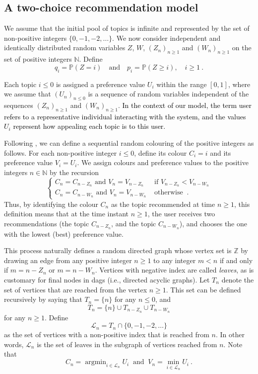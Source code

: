 \documentclass[12pt]{article}
\newcommand{\N}{\mathbb{N}}
\newcommand{\Z}{\mathbb{Z}}
\numberwithin{equation}{section} \font\titre=cmbx12
\newcommand{\argmin}{\mathop{\mathrm{argmin}}}
\newcommand{\PP}{\mathbb{P}}
\newcommand{\Lset}{\mathcal{L}} %
\begin{document}
\subsection{A two-choice recommendation model}

We assume that the initial pool of topics is infinite and represented by the set of non-positive integers $\{0, -1, -2,\ldots\}$.
We now consider independent and identically distributed random variables $Z$, $W$, $(Z_n)_{n\ge 1}$ and $(W_n)_{n\ge 1}$
on the set of positive integers $\N$.
Define 
$$
q_i=\PP(Z=i) \quad \text{and} \quad p_i=\PP(Z\ge i), \quad i \ge 1~.
$$

Each topic $i \leq 0$ is assigned a preference value $U_i$ within the range $[0,1]$, where we assume that $(U_n)_{n\leq0}$ is a sequence of random variables independent of the sequences $(Z_n)_{n\geq1}$ and $(W_n)_{n\geq1}$. \textcolor{black}{In the context of our model, the term user refers to a representative individual interacting with the system, and the values $U_i$ represent how appealing each topic is to this user.}


Following \cite{surf}, we can define a sequential random colouring of the positive integers as follows. For each non-positive integer $i\le 0$, define its colour $C_i=i$ and its preference value $V_i=U_i$. We assign colours and preference values to the positive integers $n\in \N$ by the recursion 
$$
\left\{
\begin{array}{ll}

    C_n=C_{n-Z_n} \text{ and } V_n=V_{n-Z_n} & \text{ if } V_{n-Z_n}< V_{n-W_n} \\
    C_n=C_{n-W_n} \text{ and } V_n=V_{n-W_n} & \text{ otherwise }~.
\end{array}
\right.
$$
Thus, by identifying the colour $C_n$ as the topic recommended at time $n\ge 1$, this definition means that at the time instant $n\ge 1$, the user receives two recommendations (the topic $C_{n-Z_n}$, and the topic $C_{n-W_n}$), and chooses the one with the lowest (best) preference value.



This process naturally defines a random directed graph whose vertex set is $\Z$ by drawing an edge from any positive integer $n\ge 1$ to any integer $m<n$ if and only if $m=n-Z_n$ or $m=n-W_n$. Vertices with negative index are called \textit{leaves}, as is customary for final nodes in dags (i.e., directed acyclic graphs). 
Let $T_n$ denote the set of vertices that are reached from the vertex $n\ge 1$. This set can be defined recursively by saying that $T_n=\{ n \}$ for any $n\le 0$, and $$T_n=\{n\}\cup T_{n-Z_n} \cup T_{n-W_n}$$ for any $n\ge 1$. Define $$\Lset_n=T_n\cap \{0, -1, -2, \dots\}$$ as the set of vertices with a non-positive index that is reached from $n$. In other words, $\Lset_n$ is the set of leaves in the subgraph of vertices reached from $n$. Note that 
\begin{equation*}
    C_n=\argmin_{i\in \Lset_n} U_i ~\text{ and }~ V_n=\min_{i\in \Lset_n} U_i~.
\end{equation*}
\end{document}
